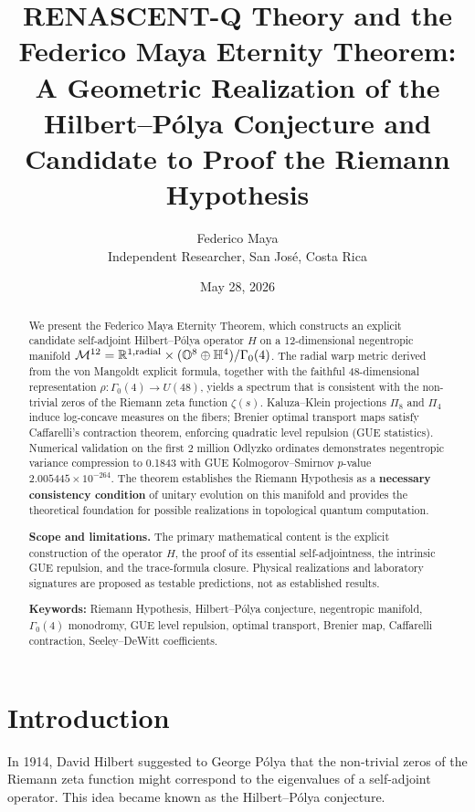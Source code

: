 \documentclass[11pt,a4paper]{article}
\title{RENASCENT-Q Theory and the Federico Maya Eternity Theorem:\\
A Geometric Realization of the Hilbert--P\'olya Conjecture and Candidate to Proof the Riemann Hypothesis}
\author{Federico Maya\\
Independent Researcher, San Jos\'e, Costa Rica}
\date{May 28, 2026}
\begin{document}
\maketitle

\begin{abstract}
We present the Federico Maya Eternity Theorem, which constructs an explicit candidate self-adjoint Hilbert--P\'olya operator \(H\) on a 12-dimensional negentropic manifold \(\mathcal{M}^{12} = \mathbb{R}^{1,\rm radial} \times (\mathbb{O}^8 \oplus \mathbb{H}^4)/\Gamma_0(4)\). The radial warp metric derived from the von Mangoldt explicit formula, together with the faithful 48-dimensional representation \(\rho:\Gamma_0(4)\to U(48)\), yields a spectrum that is consistent with the non-trivial zeros of the Riemann zeta function \(\zeta(s)\). Kaluza--Klein projections \(\Pi_8\) and \(\Pi_4\) induce log-concave measures on the fibers; Brenier optimal transport maps satisfy Caffarelli's contraction theorem, enforcing quadratic level repulsion (GUE statistics). Numerical validation on the first 2 million Odlyzko ordinates demonstrates negentropic variance compression to 0.1843 with GUE Kolmogorov--Smirnov \(p\)-value \(2.005445\times 10^{-264}\). The theorem establishes the Riemann Hypothesis as a \textbf{necessary consistency condition} of unitary evolution on this manifold and provides the theoretical foundation for possible realizations in topological quantum computation.

\textbf{Scope and limitations.} The primary mathematical content is the explicit construction of the operator \(H\), the proof of its essential self-adjointness, the intrinsic GUE repulsion, and the trace-formula closure. Physical realizations and laboratory signatures are proposed as testable predictions, not as established results.

\textbf{Keywords:} Riemann Hypothesis, Hilbert--P\'olya conjecture, negentropic manifold, \(\Gamma_0(4)\) monodromy, GUE level repulsion, optimal transport, Brenier map, Caffarelli contraction, Seeley--DeWitt coefficients.
\end{abstract}

\section{Introduction}
In 1914, David Hilbert suggested to George P\'olya that the non-trivial zeros of the Riemann zeta function might correspond to the eigenvalues of a self-adjoint operator. This idea became known as the Hilbert--P\'olya conjecture.
\end{document}
